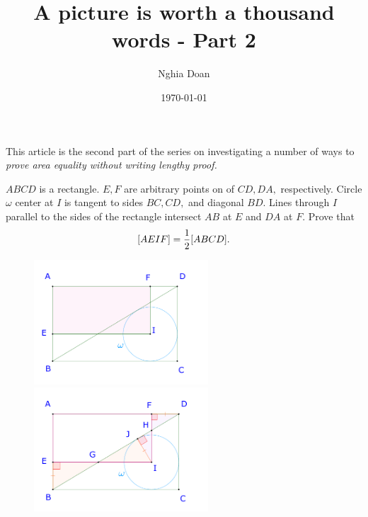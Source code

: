 \documentclass{article}
\title{A picture is worth a thousand words - Part 2}
\author{Nghia Doan}
\date{\today}
\begin{document}
\maketitle

This article is the second part of the series on investigating a number of ways to \textit{prove area equality without writing lengthy proof.}

\begin{example*}[Example 6]
    $ABCD$ is a rectangle. $E, F$ are arbitrary points on of $CD, DA,$ respectively.
    Circle $\omega$ center at $I$ is tangent to sides $BC, CD,$ and diagonal $BD.$
    Lines through $I$ parallel to the sides of the rectangle intersect $AB$ at $E$ and $DA$ at $F.$
    Prove that
    \[
        [AEIF] = \frac{1}{2} [ABCD].
    \]
\end{example*}

\begin{figure}[h]
    \centering
    \begin{minipage}[t]{6.5cm}
        \begin{center}
            \includegraphics[width=6.5cm]{./svg/pdf/23-24-s3-i-p6.pdf}
        \end{center}
    \end{minipage}
    \qquad
    \begin{minipage}[t]{6.5cm}
        \centering
        \begin{center}
            \includegraphics[width=6.5cm]{./svg/pdf/23-24-s3-i-p6-s.pdf}
        \end{center}
    \end{minipage}
\end{figure}
\end{document}
